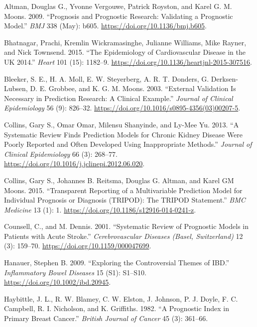 \documentclass[
]{article}
\newlength{\cslhangindent}
\newenvironment{cslreferences}%
  {\setlength{\parindent}{0pt}%
  \everypar{\setlength{\hangindent}{\cslhangindent}}\ignorespaces}%
  {\par}
\begin{document}
\hypertarget{refs}{}
\begin{cslreferences}
\leavevmode\hypertarget{ref-altman_prognosis_2009}{}%
Altman, Douglas G., Yvonne Vergouwe, Patrick Royston, and Karel G. M. Moons. 2009. ``Prognosis and Prognostic Research: Validating a Prognostic Model.'' \emph{BMJ} 338 (May): b605. \url{https://doi.org/10.1136/bmj.b605}.

\leavevmode\hypertarget{ref-bhatnagar_epidemiology_2015}{}%
Bhatnagar, Prachi, Kremlin Wickramasinghe, Julianne Williams, Mike Rayner, and Nick Townsend. 2015. ``The Epidemiology of Cardiovascular Disease in the UK 2014.'' \emph{Heart} 101 (15): 1182--9. \url{https://doi.org/10.1136/heartjnl-2015-307516}.

\leavevmode\hypertarget{ref-bleeker_external_2003}{}%
Bleeker, S. E., H. A. Moll, E. W. Steyerberg, A. R. T. Donders, G. Derksen-Lubsen, D. E. Grobbee, and K. G. M. Moons. 2003. ``External Validation Is Necessary in Prediction Research: A Clinical Example.'' \emph{Journal of Clinical Epidemiology} 56 (9): 826--32. \url{https://doi.org/10.1016/s0895-4356(03)00207-5}.

\leavevmode\hypertarget{ref-collins_systematic_2013}{}%
Collins, Gary S., Omar Omar, Milensu Shanyinde, and Ly-Mee Yu. 2013. ``A Systematic Review Finds Prediction Models for Chronic Kidney Disease Were Poorly Reported and Often Developed Using Inappropriate Methods.'' \emph{Journal of Clinical Epidemiology} 66 (3): 268--77. \url{https://doi.org/10.1016/j.jclinepi.2012.06.020}.

\leavevmode\hypertarget{ref-collins_transparent_2015}{}%
Collins, Gary S., Johannes B. Reitsma, Douglas G. Altman, and Karel GM Moons. 2015. ``Transparent Reporting of a Multivariable Prediction Model for Individual Prognosis or Diagnosis (TRIPOD): The TRIPOD Statement.'' \emph{BMC Medicine} 13 (1): 1. \url{https://doi.org/10.1186/s12916-014-0241-z}.

\leavevmode\hypertarget{ref-counsell_systematic_2001}{}%
Counsell, C., and M. Dennis. 2001. ``Systematic Review of Prognostic Models in Patients with Acute Stroke.'' \emph{Cerebrovascular Diseases (Basel, Switzerland)} 12 (3): 159--70. \url{https://doi.org/10.1159/000047699}.

\leavevmode\hypertarget{ref-hanauer_exploring_2009}{}%
Hanauer, Stephen B. 2009. ``Exploring the Controversial Themes of IBD.'' \emph{Inflammatory Bowel Diseases} 15 (S1): S1--S10. \url{https://doi.org/10.1002/ibd.20945}.

\leavevmode\hypertarget{ref-haybittle_prognostic_1982}{}%
Haybittle, J. L., R. W. Blamey, C. W. Elston, J. Johnson, P. J. Doyle, F. C. Campbell, R. I. Nicholson, and K. Griffiths. 1982. ``A Prognostic Index in Primary Breast Cancer.'' \emph{British Journal of Cancer} 45 (3): 361--66.


\end{cslreferences}
\end{document}
